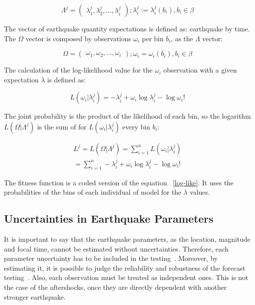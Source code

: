 \begin{equation}
	\Lambda^j = 
\begin{pmatrix}
    \lambda_1^j, 
    \lambda_2^j, 
    \hdots,
    \lambda_i^j
  \end{pmatrix}
  ;\lambda_i^j := \lambda_i^j(b_i),b_i \in \beta
\end{equation}
		
The vector of earthquake quantity expectations is defined as:
earthquake by time. The $\Omega$ vector is composed by observations
$\omega_i$ per bin $b_i$, as the $\Lambda$ vector:

\begin{equation}
\Omega = 
\begin{pmatrix}
    \omega_1,
    \omega_2,
    \hdots,
    \omega_i
  \end{pmatrix}
  ;\omega_i =\omega_i(b_i),b_i \in \beta
\end{equation}

The calculation of the log-likelihood value for the $\omega_i$
observation with a given expectation $\lambda$ is defined as:


\begin{equation}
	L(\omega_i|\lambda_i^j) = -\lambda_i^j + \omega_i\log\lambda_i^j - \log\omega_i!
\end{equation}

The joint probability is the product of the likelihood of each bin, so
the logarithm $L(\Omega|\Lambda^j)$ is the sum of for
$L(\omega_i|\lambda_i^j)$ every bin $b_i$:

\begin{equation}\label{log-like}
\begin{split}
	L^j = L(\Omega|\Lambda^j) = \sum_{i=1}^{n}L(\omega_i|\lambda_i^j)  \\
	= \sum_{i=1}^{n} -\lambda_i^j + \omega_i\log\lambda_i^j - \log\omega_i!  
\end{split}
\end{equation}

The fitness function is a coded version of the equation
~\ref{log-like}. It uses the probabilities of the bins of each
individual of model for the $\lambda$ values.\\
				
\subsection{Uncertainties in Earthquake Parameters}
It is important to say that the earthquake parameters, as the location, magnitude and focal time, cannot be estimated without uncertainties. Therefore, each parameter uncertainty has to be included in the testing~\cite{schorlemmer2007earthquake}. Moreover, by estimating it, it is possible to judge the reliability and robustness of the forecast testing~\cite{eberhard2014multiscale}. Also, each observation must be treated as independent ones. This is not the case of the aftershocks, once they are directly dependent with another stronger earthquake. \\

